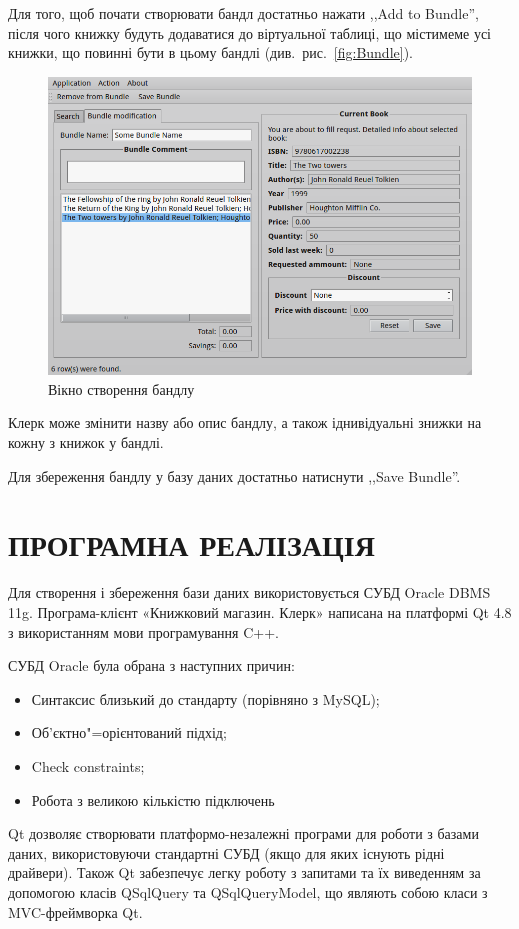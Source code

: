 \documentclass[a4paper,notitlepage,headsepline,pdftex,oneside]{report}
\newcommand{\setfontsize}[1]{\fontsize{#1pt}{#1pt}\selectfont}
\newcommand{\Chapter}[1]{\chapter{#1} \renewcommand{\baselinestretch}{1.5}\setfontsize{14pt}}
\begin{document}
    Для того, щоб почати створювати бандл достатньо нажати ,,Add to Bundle'',
    після чого книжку будуть додаватися до віртуальної таблиці, що містимеме
    усі книжки, що повинні бути в цьому бандлі (див.~рис.~\ref{fig:Bundle}).
    \begin{figure}[h]
      \centering
      \includegraphics[width=\textwidth]{bundle.png}
      \caption{Вікно створення бандлу}
      \label{fig:bundle}
    \end{figure}

    Клерк може змінити назву або опис бандлу, а також іднивідуальні знижки на
    кожну з книжок у бандлі.

    Для збереження бандлу у базу даних достатньо натиснути ,,Save Bundle''.

\Chapter{ПРОГРАМНА РЕАЛІЗАЦІЯ}
  Для створення і збереження бази даних використовується СУБД Oracle DBMS 11g.
  Програма-клієнт «Книжковий магазин. Клерк» написана на платформі Qt 4.8 з
  використанням мови програмування C++.

  СУБД Oracle була обрана з наступних причин:
  \begin{itemize}
    \item Синтаксис близький до стандарту (порівняно з MySQL);
    \item Об'єктно"=орієнтований підхід;
    \item Check constraints;
    \item Робота з великою кількістю підключень
  \end{itemize}

  Qt дозволяє створювати платформо-незалежні програми для роботи з базами
  даних, використовуючи стандартні СУБД (якщо для яких існують рідні
  драйвери).
  Також Qt забезпечує легку роботу з запитами та їх виведенням за допомогою
  класів QSqlQuery та QSqlQueryModel, що являють собою класи з MVC-фреймворка
  Qt.
\end{document}
